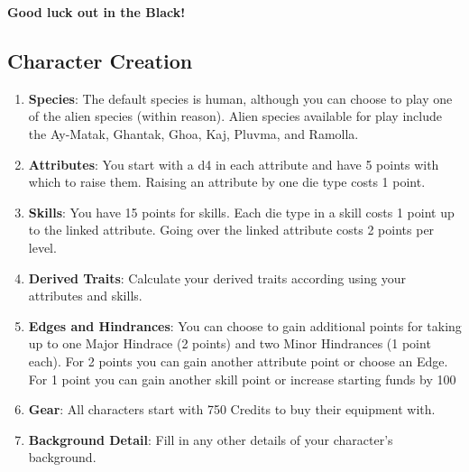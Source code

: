 \documentclass[10pt,twoside]{article}
\begin{document}
    \textbf{Good luck out in the Black!}

    \newpage

    \begin{multicols}{2}

        \tableofcontents


        \section{Character Creation}

        \begin{enumerate}

            \item \textbf{Species}: The default species is human, although you can choose to play one of the alien species (within reason). Alien species available for play include the Ay-Matak, Ghantak, Ghoa, Kaj, Pluvma, and Ramolla.

            \item \textbf{Attributes}: You start with a d4 in each attribute and have 5 points with which to raise them. Raising an attribute by one die type costs 1 point.

            \item \textbf{Skills}: You have 15 points for skills. Each die type in a skill costs 1 point up to the linked attribute. Going over the linked attribute costs 2 points per level.

            \item \textbf{Derived Traits}: Calculate your derived traits according using your attributes and skills.

            \item \textbf{Edges and Hindrances}: You can choose to gain additional points for taking up to one Major Hindrace (2 points) and two Minor Hindrances (1 point each). For 2 points you can gain another attribute point or choose an Edge. For 1 point you can gain another skill point or increase starting funds by 100%

            \item \textbf{Gear}: All characters start with 750 Credits to buy their equipment with.

            \item \textbf{Background Detail}: Fill in any other details of your character's background.

        \end{enumerate}


\end{multicols}
\end{document}
